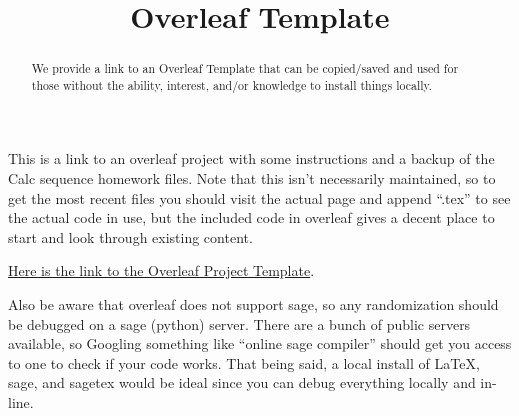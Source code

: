\documentclass{ximera}
\title{Overleaf Template}
\begin{document}
\begin{abstract}
    We provide a link to an Overleaf Template that can be copied/saved and used for those without the ability, interest, and/or knowledge to install things locally.
\end{abstract}
\maketitle

This is a link to an overleaf project with some instructions and a backup of the Calc sequence homework files. Note that this isn't necessarily maintained, so to get the most recent files you should visit the actual page and append ``.tex'' to see the actual code in use, but the included code in overleaf gives a decent place to start and look through existing content.

\href{https://www.overleaf.com/read/ptfwfbvzfxjz}{Here is the link to the Overleaf Project Template}. 

Also be aware that overleaf does not support sage, so any randomization should be debugged on a sage (python) server. There are a bunch of public servers available, so Googling something like ``online sage compiler'' should get you access to one to check if your code works. That being said, a local install of LaTeX, sage, and sagetex would be ideal since you can debug everything locally and in-line.
\end{document}
